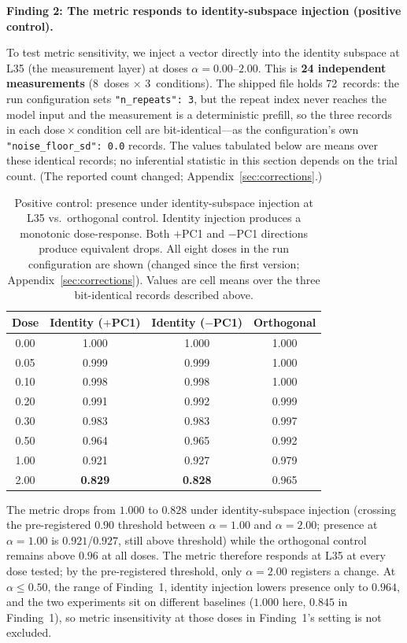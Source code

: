 \documentclass[11pt,a4paper]{article}
\begin{document}
\textbf{Finding 2: The metric responds to identity-subspace injection
(positive control).}

To test metric sensitivity, we inject a vector directly into the
identity subspace at L35 (the measurement layer) at doses
$\alpha = 0.00$--$2.00$. This is \textbf{24 independent measurements}
(8~doses $\times$ 3~conditions). The shipped file holds 72~records: the
run configuration sets \texttt{"n\_repeats": 3}, but the repeat index
never reaches the model input and the measurement is a deterministic
prefill, so the three records in each dose\,$\times$\,condition cell are
bit-identical---as the configuration's own \texttt{"noise\_floor\_sd": 0.0}
records. The values tabulated below are means over these identical
records; no inferential statistic in this section depends on the trial
count. (The reported count changed; Appendix~\ref{sec:corrections}.)

\begin{table}[H]
\centering
\caption{Positive control: presence under identity-subspace injection at
L35 vs.\ orthogonal control. Identity injection produces a monotonic
dose-response. Both $+$PC1 and $-$PC1 directions produce equivalent drops.
All eight doses in the run configuration are shown (changed since the
first version; Appendix~\ref{sec:corrections}). Values are cell means
over the three bit-identical records described above.}
\label{tab:positive_control}
\begin{tabular}{cccc}
\toprule
Dose & Identity ($+$PC1) & Identity ($-$PC1) & Orthogonal \\
\midrule
0.00 & 1.000 & 1.000 & 1.000 \\
0.05 & 0.999 & 0.999 & 1.000 \\
0.10 & 0.998 & 0.998 & 1.000 \\
0.20 & 0.991 & 0.992 & 0.999 \\
0.30 & 0.983 & 0.983 & 0.997 \\
0.50 & 0.964 & 0.965 & 0.992 \\
1.00 & 0.921 & 0.927 & 0.979 \\
2.00 & \textbf{0.829} & \textbf{0.828} & 0.965 \\
\bottomrule
\end{tabular}
\end{table}

The metric drops from $1.000$ to $0.828$ under identity-subspace injection
(crossing the pre-registered $0.90$ threshold between $\alpha{=}1.00$
and $\alpha{=}2.00$; presence at $\alpha{=}1.00$ is $0.921$/$0.927$,
still above threshold) while the orthogonal control remains above $0.96$
at all doses. The metric therefore responds at L35 at every dose
tested; by the pre-registered threshold, only $\alpha{=}2.00$ registers
a change. At $\alpha \le 0.50$, the range of Finding~1, identity
injection lowers presence only to $0.964$, and the two experiments sit on
different baselines ($1.000$ here, $0.845$ in Finding~1), so metric
insensitivity at those doses in Finding~1's setting is not excluded.
\end{document}
